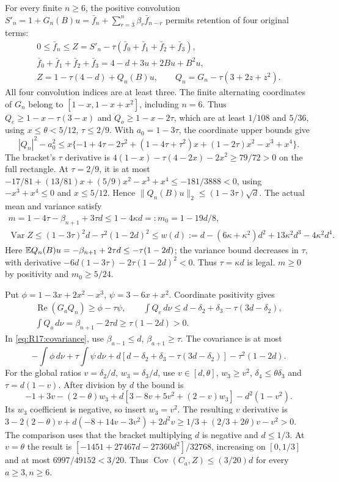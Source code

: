 For every finite $n\ge6$, the positive convolution
$S'_n=1+G_n(B)u=\bar f_n+\sum_{r=3}^n\beta_r\bar f_{n-r}$
permits retention of four original terms:
\begin{equation}\tag{R17.4.1}\label{eq:R17:fourterms}
\begin{gathered}
0\le\bar f_n\le Z=S'_n-\tau(\bar f_0+\bar f_1+\bar f_2+\bar f_3),\\
\bar f_0+\bar f_1+\bar f_2+\bar f_3=4-d+3u+2Bu+B^2u,\\
Z=1-\tau(4-d)+Q_n(B)u,\qquad Q_n=G_n-\tau(3+2z+z^2).
\end{gathered}
\end{equation}
All four convolution indices are at least three. The finite alternating
coordinates of $G_n$ belong to $[1-x,1-x+x^2]$, including $n=6$.
Thus $Q_e\ge1-x-\tau(3-x)$ and $Q_o\ge1-x-2\tau$, which are at
least $1/108$ and $5/36$, using $x\le\theta<5/12$, $\tau\le2/9$.
With $a_0=1-3\tau$, the coordinate upper bounds give
\[
|Q_n|^2-a_0^2\le x\{-1+4\tau-2\tau^2+(1-4\tau+\tau^2)x
+(1-2\tau)x^2-x^3+x^4\}.
\]
The bracket's $\tau$ derivative is
$4(1-x)-\tau(4-2x)-2x^2\ge79/72>0$ on the full rectangle.
At $\tau=2/9$, it is at most
$-17/81+(13/81)x+(5/9)x^2-x^3+x^4\le-181/3888<0$,
using $-x^3+x^4\le0$ and $x\le5/12$.
Hence $\|Q_n(B)u\|_2\le(1-3\tau)\sqrt d$.
The actual mean and variance satisfy
\begin{equation}\tag{R17.4.3}\label{eq:R17:longmoments}
\begin{gathered}
m=1-4\tau-\beta_{n+1}+3\tau d\le1-4\kappa d=:m_0=1-19d/8,\\
\operatorname{Var}Z\le(1-3\tau)^2d-\tau^2(1-2d)^2
\le w(d):=d-(6\kappa+\kappa^2)d^2+13\kappa^2d^3-4\kappa^2d^4.
\end{gathered}
\end{equation}
Here $\mathbb E Q_n(B)u=-\beta_{n+1}+2\tau d\le-\tau(1-2d)$;
the variance bound decreases in $\tau$, with derivative
$-6d(1-3\tau)-2\tau(1-2d)^2<0$. Thus $\tau=\kappa d$ is legal.
$m\ge0$ by positivity and $m_0\ge5/24$.

Put $\phi=1-3x+2x^2-x^3$, $\psi=3-6x+x^2$.
Coordinate positivity gives
\[
\begin{gathered}
\operatorname{Re}(G_aQ_n)\ge\phi-\tau\psi,\qquad
\int Q_e\,d\nu\le d-\delta_2+\delta_3-\tau(3d-\delta_2),\\
\int Q_o\,d\nu=\beta_{n+1}-2\tau d\ge\tau(1-2d)>0.
\end{gathered}
\]
In \eqref{eq:R17:covariance}, use $\beta_{a-1}\le d$,
$\beta_{a+1}\ge\tau$. The covariance is at most
\[
-\int\phi\,d\nu+\tau\int\psi\,d\nu
+d[d-\delta_2+\delta_3-\tau(3d-\delta_2)]-\tau^2(1-2d).
\]
For the global ratios $v=\delta_2/d$, $w_3=\delta_3/d$, use
$v\in[d,\theta]$, $w_3\ge v^2$, $\delta_4\le\theta\delta_3$ and
$\tau=d(1-v)$. After division by $d$ the bound is
\[
-1+3v-(2-\theta)w_3+d[3-8v+5v^2+(2-v)w_3]-d^2(1-v^2).
\]
Its $w_3$ coefficient is negative, so insert $w_3=v^2$.
The resulting $v$ derivative is
$3-2(2-\theta)v+d(-8+14v-3v^2)+2d^2v
\ge1/3+(2/3+2\theta)v-v^2>0$.
The comparison uses that the bracket multiplying $d$ is negative and
$d\le1/3$. At $v=\theta$ the result is
$[-1451+27467d-27360d^2]/32768$, increasing on $[0,1/3]$
and at most $6997/49152<3/20$. Thus
$\operatorname{Cov}(C_a,Z)\le(3/20)d$ for every $a\ge3,n\ge6$.

